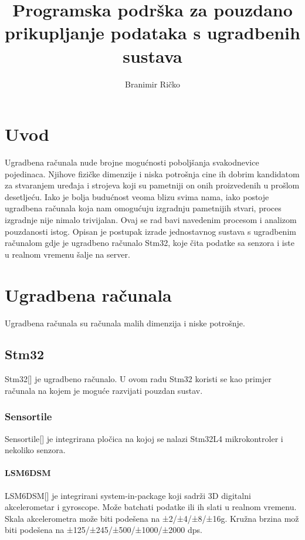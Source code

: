 \documentclass[times, utf8, diplomski]{diplomski}
\begin{document}

\title{Programska podrška za pouzdano prikupljanje podataka s ugradbenih sustava}

\author{Branimir Ričko}

\maketitle


\tableofcontents

\chapter{Uvod}
Ugradbena računala nude brojne mogućnosti poboljšanja svakodnevice pojedinaca. Njihove fizičke dimenzije i niska potrošnja cine ih dobrim kandidatom za stvaranjem uređaja i strojeva koji su pametniji on onih proizvedenih u prošlom desetljeću. Iako je bolja budućnost veoma blizu svima nama, iako postoje ugradbena računala koja nam omogućuju izgradnju pametnijih stvari, proces izgradnje nije nimalo trivijalan. Ovaj se rad bavi navedenim procesom i analizom pouzdanosti istog. Opisan je postupak izrade jednostavnog sustava s ugradbenim računalom gdje je ugradbeno računalo Stm32, koje čita podatke sa senzora i iste u realnom vremenu šalje na server.

\chapter{Ugradbena računala}
Ugradbena računala su računala malih dimenzija i niske potrošnje. 

\section{Stm32}
Stm32[\cite{STM32L476JG}] je ugradbeno računalo. U ovom radu Stm32 koristi se kao primjer računala na kojem je moguće razvijati pouzdan sustav.

\subsection{Sensortile}
Sensortile[\cite{sensortile}] je integrirana pločica na kojoj se nalazi Stm32L4 mikrokontroler i nekoliko senzora.

\subsubsection{LSM6DSM}
LSM6DSM[\cite{LSM6DSM}] je integrirani system-in-package koji sadrži 3D digitalni akcelerometar i gyroscope. Može batchati podatke ili ih slati u realnom
vremenu. Skala akcelerometra može biti podešena na ±2/±4/±8/±16g. Kružna brzina mož biti podešena na
±125/±245/±500/±1000/±2000 dps.
\end{document}
